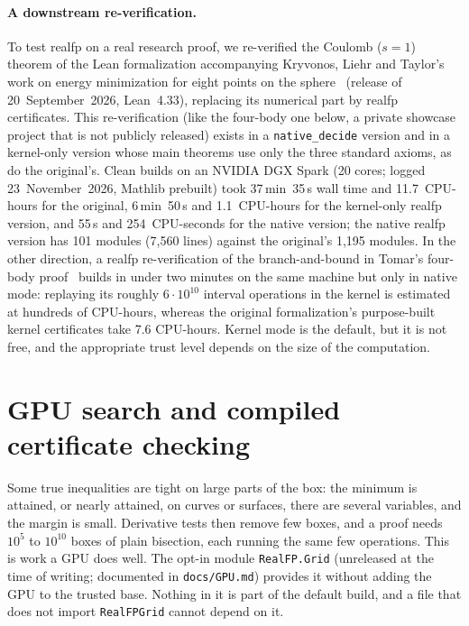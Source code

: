 \documentclass[11pt]{article}
\theoremstyle{definition}
\theoremstyle{remark}
\newcommand{\lean}[1]{\texttt{#1}}
\newcommand{\realfp}{\textsf{realfp}}
\begin{document}
\paragraph{A downstream re-verification.}
To test \realfp{} on a real research proof, we re-verified the Coulomb
($s=1$) theorem of the Lean formalization accompanying Kryvonos, Liehr and
Taylor's work on energy minimization for eight points on the
sphere~\cite{em8} (release of 20~September~2026, Lean~4.33), replacing its
numerical part by \realfp{} certificates. This re-verification (like the four-body one below, a
private showcase project that is not publicly released) exists in a
\lean{native\_decide} version and in a kernel-only version whose main
theorems use only the three standard axioms, as do the original's. Clean
builds on an NVIDIA DGX Spark (20 cores; logged 23~November~2026, Mathlib
prebuilt) took 37\,min~35\,s wall time and 11.7~CPU-hours for the original,
6\,min~50\,s and 1.1~CPU-hours for the kernel-only \realfp{} version, and
55\,s and 254~CPU-seconds for the native version; the native \realfp{} version has 101
modules (7{,}560 lines) against the original's 1{,}195 modules. In the other direction, a
\realfp{} re-verification of the branch-and-bound in Tomar's four-body
proof~\cite{fourbody} builds in under two minutes on the same machine but
only in native mode: replaying its roughly $6\cdot10^{10}$ interval
operations in the kernel is estimated at hundreds of CPU-hours, whereas the
original formalization's purpose-built kernel certificates take 7.6
CPU-hours. Kernel mode is the default, but it is not free, and the
appropriate trust level depends on the size of the computation.


\section{GPU search and compiled certificate checking}\label{sec:grid}

Some true inequalities are tight on large parts of the box: the minimum is
attained, or nearly attained, on curves or surfaces, there are several
variables, and the margin is small. Derivative tests then remove few boxes,
and a proof needs $10^5$ to $10^{10}$ boxes of plain bisection, each running
the same few operations. This is work a GPU does well. The opt-in module
\lean{RealFP.Grid} (unreleased at the time of writing; documented in
\texttt{docs/GPU.md}) provides it without adding the GPU to the trusted base.
Nothing in it is part of the default build, and a file that does not import
\lean{RealFPGrid} cannot depend on it.
\end{document}
